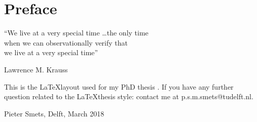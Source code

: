 \chapter*{Preface}\label{ch:preface}

\epigraph{
   ``We live at a very special time \ldots the only time\\
    when we can observationally verify that\\ we live at a very special time''
}{Lawrence M. Krauss}


\noindent This is the \LaTeX layout used for my PhD thesis \citep{Smets2018_phd}. If you have any further question related to the \LaTeX\space thesis style: contact me at p.s.m.smets@tudelft.nl.

\bigskip
\noindent
Pieter Smets, \newline Delft,  March 2018